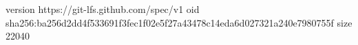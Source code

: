 version https://git-lfs.github.com/spec/v1
oid sha256:ba256d2dd4f533691f3fec1f02e5f27a43478c14eda6d027321a240e7980755f
size 22040
